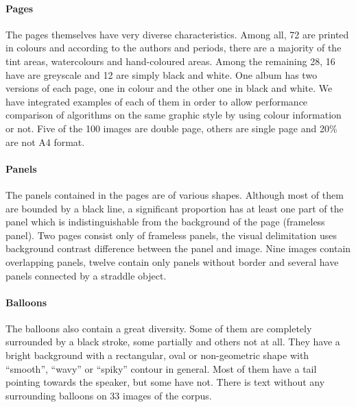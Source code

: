 
\paragraph{Pages} %
\label{par:pages}
The pages themselves have very diverse characteristics.
Among all, 72 are printed in colours and according to the authors and periods, there are a majority of the tint areas, watercolours and hand-coloured areas.
Among the remaining 28, 16 have are greyscale and 12 are simply black and white.
One album has two versions of each page, one in colour and the other one in black and white.
We have integrated examples of each of them in order to allow performance comparison of algorithms on the same graphic style by using colour information or not.
Five of the 100 images are double page, others are single page and 20\% are not A4 format.

\paragraph{Panels} %
\label{par:panels}
The panels contained in the pages are of various shapes.
Although most of them are bounded by a black line, a significant proportion has at least one part of the panel which is indistinguishable from the background of the page (frameless panel).
Two pages consist only of frameless panels, the visual delimitation uses background contrast difference between the panel and image.
Nine images contain overlapping panels, twelve contain only panels without border and several have panels connected by a straddle object.


\paragraph{Balloons} %
\label{par:balloons}
The balloons also contain a great diversity.
Some of them are completely surrounded by a black stroke, some partially and others not at all.
They have a bright background with a rectangular, oval or non-geometric shape with ``smooth'', ``wavy'' or ``spiky'' contour in general.
Most of them have a tail pointing towards the speaker, but some have not.
There is text without any surrounding balloons on 33 images of the corpus.

